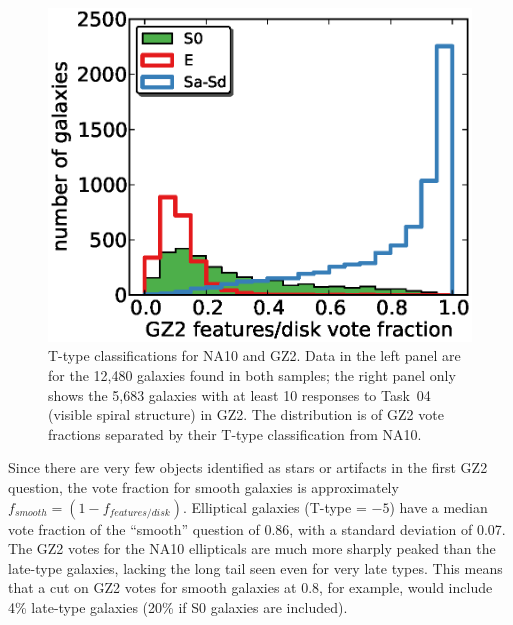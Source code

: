 \documentclass[useAMS,usenatbib]{mn2e}
\begin{document}
\begin{figure}
\includegraphics[angle=0,width=7.0in]{figures/na_ttype.eps}
\caption{T-type classifications for NA10 and GZ2. Data in the left panel are for the 12,480 galaxies found in both samples; the right panel only shows the 5,683 galaxies with at least 10 responses to Task~04 (visible spiral structure) in GZ2. The distribution is of GZ2 vote fractions separated by their T-type classification from NA10. 
\label{fig-na_ttype}}
\end{figure}

Since there are very few objects identified as stars or artifacts in the first GZ2 question, the vote fraction for smooth galaxies is approximately $f_{smooth} = (1 - f_{features/disk})$. Elliptical galaxies (T-type = $-5$) have a median vote fraction of the ``smooth'' question of 0.86, with a standard deviation of 0.07. The GZ2 votes for the NA10 ellipticals are much more sharply peaked than the late-type galaxies, lacking the long tail seen even for very late types. This means that a cut on GZ2 votes for smooth galaxies at 0.8, for example, would include 4\% late-type galaxies (20\% if S0 galaxies are included). 
\end{document}
